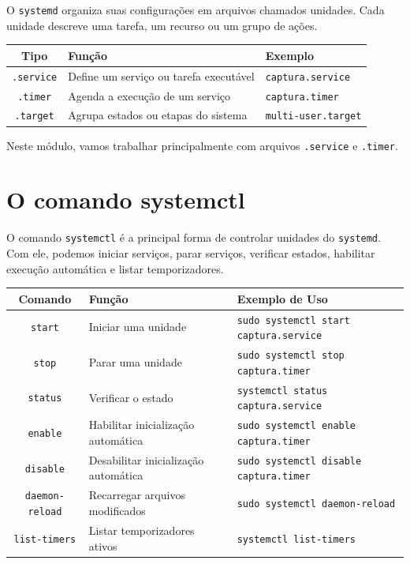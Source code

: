 \documentclass[12pt]{article}
\begin{document}
O \texttt{systemd} organiza suas configurações em arquivos chamados unidades. Cada unidade descreve uma tarefa, um recurso ou um grupo de ações.

\begin{cmdbox}
\begin{tabularx}{\linewidth}{@{}C >{\raggedright\arraybackslash}X >{\raggedright\arraybackslash}X@{}}
\toprule
\textbf{Tipo} & \textbf{Função} & \textbf{Exemplo} \\
\midrule
\texttt{.service} & Define um serviço ou tarefa executável & \texttt{captura.service} \\
\texttt{.timer} & Agenda a execução de um serviço & \texttt{captura.timer} \\
\texttt{.target} & Agrupa estados ou etapas do sistema & \texttt{multi-user.target} \\
\bottomrule
\end{tabularx}
\end{cmdbox}

Neste módulo, vamos trabalhar principalmente com arquivos \texttt{.service} e \texttt{.timer}.

\section{O comando systemctl}

O comando \texttt{systemctl} é a principal forma de controlar unidades do \texttt{systemd}. Com ele, podemos iniciar serviços, parar serviços, verificar estados, habilitar execução automática e listar temporizadores.

\begin{cmdbox}
\begin{tabularx}{\linewidth}{@{}C >{\raggedright\arraybackslash}X >{\raggedright\arraybackslash}X@{}}
\toprule
\textbf{Comando} & \textbf{Função} & \textbf{Exemplo de Uso} \\
\midrule
\texttt{start} & Iniciar uma unidade & \texttt{sudo systemctl start captura.service} \\
\texttt{stop} & Parar uma unidade & \texttt{sudo systemctl stop captura.timer} \\
\texttt{status} & Verificar o estado & \texttt{systemctl status captura.service} \\
\texttt{enable} & Habilitar inicialização automática & \texttt{sudo systemctl enable captura.timer} \\
\texttt{disable} & Desabilitar inicialização automática & \texttt{sudo systemctl disable captura.timer} \\
\texttt{daemon-reload} & Recarregar arquivos modificados & \texttt{sudo systemctl daemon-reload} \\
\texttt{list-timers} & Listar temporizadores ativos & \texttt{systemctl list-timers} \\
\bottomrule
\end{tabularx}
\end{cmdbox}
\end{document}
